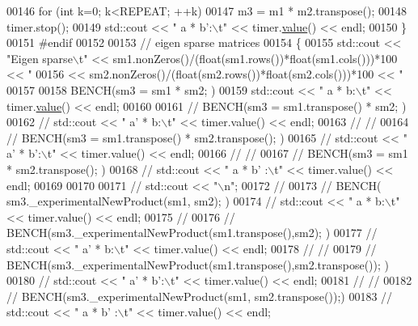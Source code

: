 \begin{DoxyCode}
{00146       \textcolor{keywordflow}{for} (\textcolor{keywordtype}{int} k=0; k<REPEAT; ++k)
00147         m3 = m1 * m2.transpose();
00148       timer.stop();
00149       std::cout << \textcolor{stringliteral}{"   a * b':\(\backslash\)t"} << timer.\hyperlink{class_eigen_1_1_bench_timer_a26760f963ed8b64c126159bfea57735e}{value}() << endl;
00150     \}
00151 \textcolor{preprocessor}{    #endif}
00152 
00153     \textcolor{comment}{// eigen sparse matrices}
00154     \{
00155       std::cout << \textcolor{stringliteral}{"Eigen sparse\(\backslash\)t"} << sm1.nonZeros()/(float(sm1.rows())*\textcolor{keywordtype}{float}(sm1.cols()))*100 << \textcolor{stringliteral}{"%
00156                 << sm2.nonZeros()/(float(sm2.rows())*\textcolor{keywordtype}{float}(sm2.cols()))*100 << \textcolor{stringliteral}{"%
00157 
00158       BENCH(sm3 = sm1 * sm2; )
00159       std::cout << \textcolor{stringliteral}{"   a * b:\(\backslash\)t"} << timer.\hyperlink{class_eigen_1_1_bench_timer_a26760f963ed8b64c126159bfea57735e}{value}() << endl;
00160 
00161 \textcolor{comment}{//       BENCH(sm3 = sm1.transpose() * sm2; )}
00162 \textcolor{comment}{//       std::cout << "   a' * b:\(\backslash\)t" << timer.value() << endl;}
00163 \textcolor{comment}{// //}
00164 \textcolor{comment}{//       BENCH(sm3 = sm1.transpose() * sm2.transpose(); )}
00165 \textcolor{comment}{//       std::cout << "   a' * b':\(\backslash\)t" << timer.value() << endl;}
00166 \textcolor{comment}{// //}
00167 \textcolor{comment}{//       BENCH(sm3 = sm1 * sm2.transpose(); )}
00168 \textcolor{comment}{//       std::cout << "   a * b' :\(\backslash\)t" << timer.value() << endl;}
00169 
00170 
00171 \textcolor{comment}{//       std::cout << "\(\backslash\)n";}
00172 \textcolor{comment}{//}
00173 \textcolor{comment}{//       BENCH( sm3.\_experimentalNewProduct(sm1, sm2); )}
00174 \textcolor{comment}{//       std::cout << "   a * b:\(\backslash\)t" << timer.value() << endl;}
00175 \textcolor{comment}{//}
00176 \textcolor{comment}{//       BENCH(sm3.\_experimentalNewProduct(sm1.transpose(),sm2); )}
00177 \textcolor{comment}{//       std::cout << "   a' * b:\(\backslash\)t" << timer.value() << endl;}
00178 \textcolor{comment}{// //}
00179 \textcolor{comment}{//       BENCH(sm3.\_experimentalNewProduct(sm1.transpose(),sm2.transpose()); )}
00180 \textcolor{comment}{//       std::cout << "   a' * b':\(\backslash\)t" << timer.value() << endl;}
00181 \textcolor{comment}{// //}
00182 \textcolor{comment}{//       BENCH(sm3.\_experimentalNewProduct(sm1, sm2.transpose());)}
00183 \textcolor{comment}{//       std::cout << "   a * b' :\(\backslash\)t" << timer.value() << endl;}
}}}
\end{DoxyCode}
